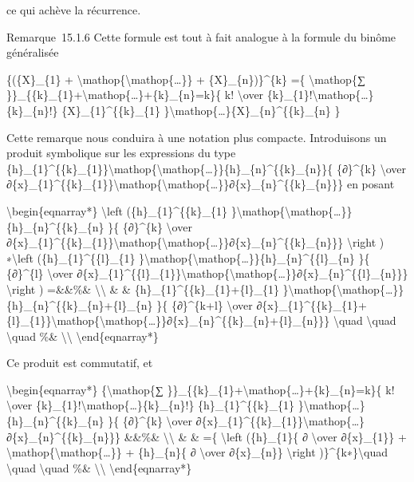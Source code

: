 ce qui achève la récurrence.

Remarque~15.1.6 Cette formule est tout à fait analogue à la formule du
binôme généralisée

\{(\{X\}\_\{1\} +
\textbackslash{}mathop\{\textbackslash{}mathop\{\ldots{}\}\} +
\{X\}\_\{n\})\}\^{}\{k\} =\{ \textbackslash{}mathop\{∑
\}\}\_\{\{k\}\_\{1\}+\textbackslash{}mathop\{\ldots{}\}+\{k\}\_\{n\}=k\}\{
k! \textbackslash{}over
\{k\}\_\{1\}!\textbackslash{}mathop\{\ldots{}\}\{k\}\_\{n\}!\}
\{X\}\_\{1\}\^{}\{\{k\}\_\{1\}
\}\textbackslash{}mathop\{\ldots{}\}\{X\}\_\{n\}\^{}\{\{k\}\_\{n\} \}

Cette remarque nous conduira à une notation plus compacte. Introduisons
un produit symbolique sur les expressions du type
\{h\}\_\{1\}\^{}\{\{k\}\_\{1\}\}\textbackslash{}mathop\{\textbackslash{}mathop\{\ldots{}\}\}\{h\}\_\{n\}\^{}\{\{k\}\_\{n\}\}\{
\{∂\}\^{}\{k\} \textbackslash{}over
∂\{x\}\_\{1\}\^{}\{\{k\}\_\{1\}\}\textbackslash{}mathop\{\textbackslash{}mathop\{\ldots{}\}\}∂\{x\}\_\{n\}\^{}\{\{k\}\_\{n\}\}\}
en posant

\textbackslash{}begin\{eqnarray*\} \textbackslash{}left
(\{h\}\_\{1\}\^{}\{\{k\}\_\{1\}
\}\textbackslash{}mathop\{\textbackslash{}mathop\{\ldots{}\}\}\{h\}\_\{n\}\^{}\{\{k\}\_\{n\}
\}\{ \{∂\}\^{}\{k\} \textbackslash{}over
∂\{x\}\_\{1\}\^{}\{\{k\}\_\{1\}\}\textbackslash{}mathop\{\textbackslash{}mathop\{\ldots{}\}\}∂\{x\}\_\{n\}\^{}\{\{k\}\_\{n\}\}\}
\textbackslash{}right ) ∗\textbackslash{}left
(\{h\}\_\{1\}\^{}\{\{l\}\_\{1\}
\}\textbackslash{}mathop\{\textbackslash{}mathop\{\ldots{}\}\}\{h\}\_\{n\}\^{}\{\{l\}\_\{n\}
\}\{ \{∂\}\^{}\{l\} \textbackslash{}over
∂\{x\}\_\{1\}\^{}\{\{l\}\_\{1\}\}\textbackslash{}mathop\{\textbackslash{}mathop\{\ldots{}\}\}∂\{x\}\_\{n\}\^{}\{\{l\}\_\{n\}\}\}
\textbackslash{}right ) =\&\&\%\& \textbackslash{}\textbackslash{} \& \&
\{h\}\_\{1\}\^{}\{\{k\}\_\{1\}+\{l\}\_\{1\}
\}\textbackslash{}mathop\{\textbackslash{}mathop\{\ldots{}\}\}\{h\}\_\{n\}\^{}\{\{k\}\_\{n\}+\{l\}\_\{n\}
\}\{ \{∂\}\^{}\{k+l\} \textbackslash{}over
∂\{x\}\_\{1\}\^{}\{\{k\}\_\{1\}+\{l\}\_\{1\}\}\textbackslash{}mathop\{\textbackslash{}mathop\{\ldots{}\}\}∂\{x\}\_\{n\}\^{}\{\{k\}\_\{n\}+\{l\}\_\{n\}\}\}
\textbackslash{}quad \textbackslash{}quad \textbackslash{}quad \%\&
\textbackslash{}\textbackslash{} \textbackslash{}end\{eqnarray*\}

Ce produit est commutatif, et

\textbackslash{}begin\{eqnarray*\} \{\textbackslash{}mathop\{∑
\}\}\_\{\{k\}\_\{1\}+\textbackslash{}mathop\{\ldots{}\}+\{k\}\_\{n\}=k\}\{
k! \textbackslash{}over
\{k\}\_\{1\}!\textbackslash{}mathop\{\ldots{}\}\{k\}\_\{n\}!\}
\{h\}\_\{1\}\^{}\{\{k\}\_\{1\}
\}\textbackslash{}mathop\{\ldots{}\}\{h\}\_\{n\}\^{}\{\{k\}\_\{n\} \}\{
\{∂\}\^{}\{k\} \textbackslash{}over
∂\{x\}\_\{1\}\^{}\{\{k\}\_\{1\}\}\textbackslash{}mathop\{\ldots{}\}∂\{x\}\_\{n\}\^{}\{\{k\}\_\{n\}\}\}
\&\&\%\& \textbackslash{}\textbackslash{} \& \& =\{ \textbackslash{}left
(\{h\}\_\{1\}\{ ∂ \textbackslash{}over ∂\{x\}\_\{1\}\} +
\textbackslash{}mathop\{\textbackslash{}mathop\{\ldots{}\}\} +
\{h\}\_\{n\}\{ ∂ \textbackslash{}over ∂\{x\}\_\{n\}\}
\textbackslash{}right )\}\^{}\{k∗\}\textbackslash{}quad
\textbackslash{}quad \textbackslash{}quad \%\&
\textbackslash{}\textbackslash{} \textbackslash{}end\{eqnarray*\}

